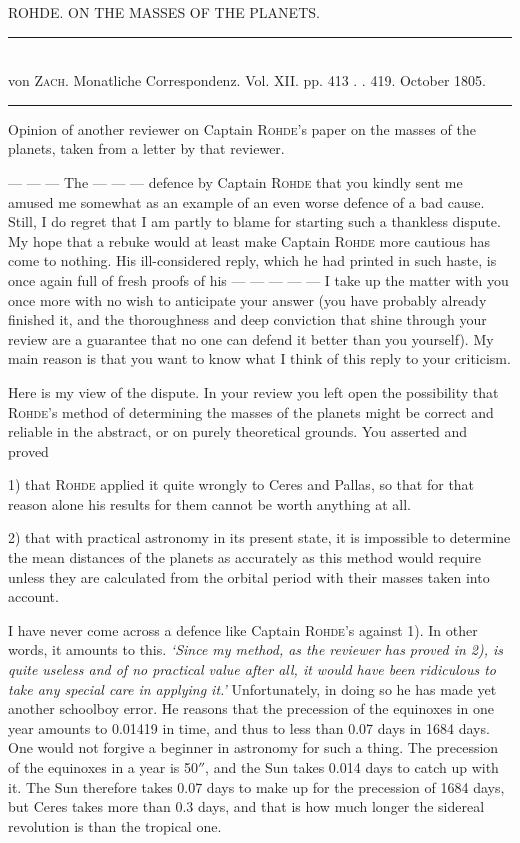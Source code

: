 \clearpage
{}
\begin{center}
{\large ROHDE. ON THE MASSES OF THE PLANETS.\par}
\medskip
\rule{0.55\linewidth}{0.4pt}\\[2pt]
von \textsc{Zach}. Monatliche Correspondenz. Vol. XII. pp. 413 . . 419. October 1805.\\[2pt]
\rule{0.55\linewidth}{0.4pt}
\end{center}
\begin{center}Opinion of another reviewer on Captain \textsc{Rohde}’s paper on the masses of the planets, taken from a letter by that reviewer.\end{center}

\noindent --- --- --- The --- --- --- defence by Captain \textsc{Rohde} that you kindly sent me amused me somewhat as an example of an even worse defence of a bad cause. Still, I do regret that I am partly to blame for starting such a thankless dispute. My hope that a rebuke would at least make Captain \textsc{Rohde} more cautious has come to nothing. His ill-considered reply, which he had printed in such haste, is once again full of fresh proofs of his --- --- --- --- --- I take up the matter with you once more with no wish to anticipate your answer (you have probably already finished it, and the thoroughness and deep conviction that shine through your review are a guarantee that no one can defend it better than you yourself). My main reason is that you want to know what I think of this reply to your criticism.

Here is my view of the dispute. In your review you left open the possibility that \textsc{Rohde}’s method of determining the masses of the planets might be correct and reliable in the abstract, or on purely theoretical grounds. You asserted and proved

1) that \textsc{Rohde} applied it quite wrongly to Ceres and Pallas, so that for that reason alone his results for them cannot be worth anything at all.

2) that with practical astronomy in its present state, it is impossible to determine the mean distances of the planets as accurately as this method would require unless they are calculated from the orbital period with their masses taken into account.

I have never come across a defence like Captain \textsc{Rohde}’s against 1). In other words, it amounts to this. \emph{‘Since my method, as the reviewer has proved in 2), is quite useless and of no practical value after all, it would have been ridiculous to take any special care in applying it.’} Unfortunately, in doing so he has made yet another schoolboy error. He reasons that the precession of the equinoxes in one year amounts to 0.01419 in time, and thus to less than 0.07 days in 1684 days. One would not forgive a beginner in astronomy for such a thing. The precession of the equinoxes in a year is 50$''$, and the Sun takes 0.014 days to catch up with it. The Sun therefore takes 0.07 days to make up for the precession of 1684 days, but Ceres takes more than 0.3 days, and that is how much longer the sidereal revolution is than the tropical one.

